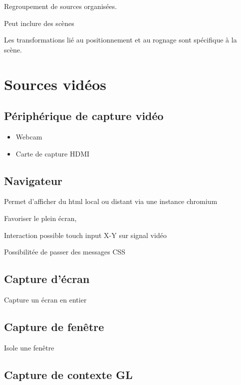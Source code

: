 \documentclass[
  french,
]{book}
\providecommand{\tightlist}{%
  \setlength{\itemsep}{0pt}\setlength{\parskip}{0pt}}
\begin{document}
Regroupement de sources organisées.

Peut inclure des scènes

Les transformations lié au positionnement et au rognage sont spécifique à la scène.

\hypertarget{sources-viduxe9os}{%
\section{Sources vidéos}\label{sources-viduxe9os}}

\hypertarget{puxe9riphuxe9rique-de-capture-viduxe9o}{%
\subsection{Périphérique de capture vidéo}\label{puxe9riphuxe9rique-de-capture-viduxe9o}}

\begin{itemize}
\tightlist
\item
  Webcam
\item
  Carte de capture HDMI
\end{itemize}

\hypertarget{navigateur}{%
\subsection{Navigateur}\label{navigateur}}

Permet d'afficher du html local ou distant via une instance chromium

Favoriser le plein écran,

Interaction possible touch input
X-Y sur signal vidéo

Possibilitée de passer des messages CSS

\hypertarget{capture-duxe9cran}{%
\subsection{Capture d'écran}\label{capture-duxe9cran}}

Capture un écran en entier

\hypertarget{capture-de-fenuxeatre}{%
\subsection{Capture de fenêtre}\label{capture-de-fenuxeatre}}

Isole une fenêtre

\hypertarget{capture-de-contexte-gl}{%
\subsection{Capture de contexte GL}\label{capture-de-contexte-gl}}
\end{document}
